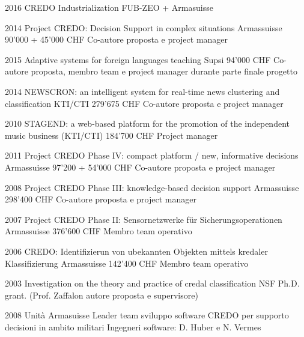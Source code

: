 \begin{cventries}
\begin{cvitems}
\item 2016 CREDO Industrialization FUB-ZEO + Armasuisse 
\item 2014 Project CREDO: Decision Support in complex situations Armassuisse 90'000 + 45'000 CHF Co-autore proposta e project manager
\item 2015 Adaptive systems for foreign languages teaching Supsi 94'000 CHF Co-autore proposta, membro team e project manager durante parte finale progetto
\item 2014 NEWSCRON: an intelligent system for real-time news clustering and classification KTI/CTI 279'675 CHF Co-autore proposta e project manager
\item 2010 STAGEND: a web-based platform for the promotion of the independent music business (KTI/CTI) 184'700 CHF Project manager
\item 2011 Project CREDO Phase IV: compact platform / new, informative decisions Armassuisse 97'200 + 54'000 CHF Co-autore proposta e project manager
\item 2008 Project CREDO Phase III: knowledge-based decision support Armassuisse 298'400 CHF Co-autore proposta e project manager
\item 2007 Project CREDO Phase II: Sensornetzwerke f\"ur Sicherungsoperationen Armassuisse 376'600 CHF Membro team operativo
\item 2006 CREDO: Identifizierun von ubekannten Objekten mittels kredaler Klassifizierung Armassuisse 142'400 CHF Membro team operativo
\item 2003 Investigation on the theory and practice of credal classification  NSF  Ph.D. grant. (Prof. Zaffalon autore proposta e supervisore)
\item 2008 Unit\`a Armasuisse Leader team sviluppo software CREDO per supporto decisioni in ambito militari Ingegneri software: D. Huber e N. Vermes
\end{cvitems}
\end{cventries}
